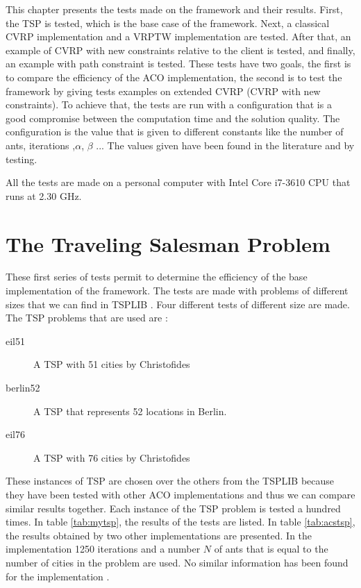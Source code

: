 This chapter presents the tests made on the framework and their results. First, the TSP is tested, which is the base case of the framework. Next, a classical CVRP implementation and a VRPTW implementation are tested. After that, an example of CVRP with new constraints relative to the client is tested, and finally, an example with path constraint is tested.
These tests have two goals, the first is to compare the efficiency of the ACO implementation, the second is to test the framework by giving tests examples on extended CVRP (CVRP with new constraints). To achieve that, the tests are run with a configuration that is a good compromise between the computation time and the solution quality. The configuration is the value  that is given to different constants like the number of ants, iterations ,$\alpha$, $\beta$ ... The values given have been found in the literature and by testing.

All the tests are made on a personal computer with Intel Core i7-3610 CPU that runs at 2.30 GHz.

\section{The Traveling Salesman Problem}
These first series of tests permit to determine the efficiency of the base implementation of the framework. The tests are made with problems of different sizes that we can find in TSPLIB \cite{tsplib}. Four different tests of different size are made. 
The TSP problems that are used are :
\begin{description}
\item[eil51] A TSP with 51 cities by Christofides
\item[berlin52] A TSP that represents 52 locations in Berlin.
\item[eil76] A TSP with 76 cities by Christofides 
\end{description}

These instances of TSP are chosen over the others from the TSPLIB because they have been tested with other ACO implementations and thus we can compare similar results together. Each instance of the TSP problem is tested a hundred times.
In table \ref{tab:mytsp}, the results of the tests are listed. In table \ref{tab:acstsp}, the results obtained by two other implementations \cite{dorigo1997acs} \cite{hlaing2011ant} are presented. In the implementation \cite{dorigo1997acs} 1250 iterations and a number $N$ of ants that is equal to the number of cities in the problem are used. No similar information has been found for the implementation \cite{hlaing2011ant}.

